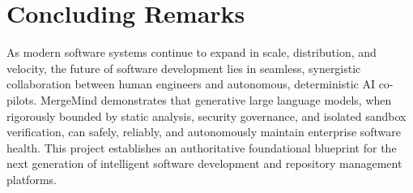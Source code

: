 \section{Concluding Remarks}
\label{sec:concluding-remarks}

As modern software systems continue to expand in scale, distribution, and velocity, the future of software development lies in seamless, synergistic collaboration between human engineers and autonomous, deterministic AI co-pilots. MergeMind demonstrates that generative large language models, when rigorously bounded by static analysis, security governance, and isolated sandbox verification, can safely, reliably, and autonomously maintain enterprise software health. This project establishes an authoritative foundational blueprint for the next generation of intelligent software development and repository management platforms.

